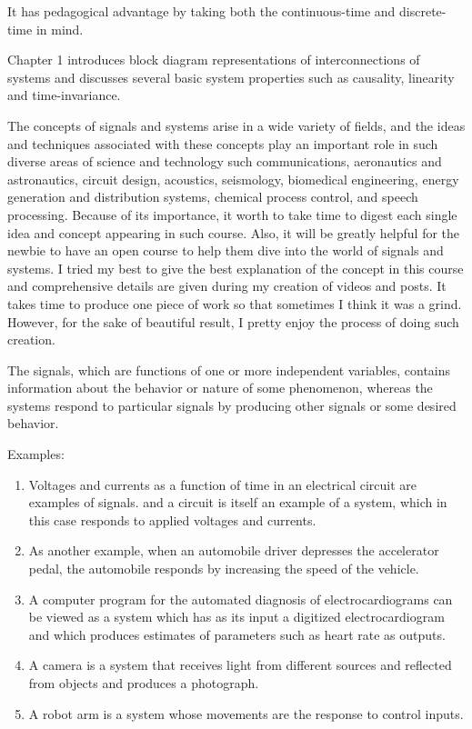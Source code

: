 \documentclass[koma,utopia,letterpaper,captions=tableheading,11pt,listings-sv,microtype,paralist,colorlinks=true,urlcolor=blue]{org-article}
\begin{document}
It has pedagogical advantage by taking both the continuous-time and
discrete-time in mind.

Chapter 1 introduces block diagram representations of interconnections of
systems and discusses several basic system properties such as causality,
linearity and time-invariance.

The concepts of signals and systems arise in a wide variety of fields, and the
ideas and techniques associated with these concepts play an important role in
such diverse areas of science and technology such communications, aeronautics
and astronautics, circuit design, acoustics, seismology, biomedical engineering,
energy generation and distribution systems, chemical process control, and speech
processing. Because of its importance, it worth to take time to digest each
single idea and concept appearing in such course. Also, it will be greatly
helpful for the newbie to have an open course to help them dive into the world
of signals and systems. I tried my best to give the best explanation of the
concept in this course and comprehensive details are given during my creation of
videos and posts. It takes time to produce one piece of work so that sometimes I
think it was a grind. However, for the sake of beautiful result, I pretty enjoy
the process of doing such creation.

The signals, which are functions of one or more independent variables, contains
information about the behavior or nature of some phenomenon, whereas the systems
respond to particular signals by producing other signals or some desired
behavior.

Examples:
\begin{enumerate}
\item Voltages and currents as a function of time in an electrical circuit are
examples of signals. and a circuit is itself an example of a system, which in
this case responds to applied voltages and currents.
\item As another example, when an automobile driver depresses the accelerator
pedal, the automobile responds by increasing the speed of the vehicle.
\item A computer program for the automated diagnosis of electrocardiograms can be
viewed as a system which has as its input a digitized electrocardiogram and
which produces estimates of parameters such as heart rate as outputs.
\item A camera is a system that receives light from different sources and reflected
from objects and produces a photograph.
\item A robot arm is a system whose movements are the response to control inputs.
\end{enumerate}
\end{document}
